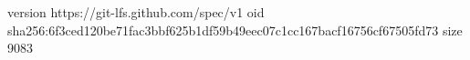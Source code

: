 version https://git-lfs.github.com/spec/v1
oid sha256:6f3ced120be71fac3bbf625b1df59b49eec07c1cc167bacf16756cf67505fd73
size 9083
